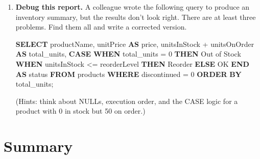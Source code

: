 \documentclass[
  letterpaper,
  DIV=11,
  numbers=noendperiod]{scrreprt}
\newenvironment{Shaded}{\begin{snugshade}}{\end{snugshade}}
\newcommand{\ControlFlowTok}[1]{\textcolor[rgb]{0.00,0.23,0.31}{\textbf{#1}}}
\newcommand{\DecValTok}[1]{\textcolor[rgb]{0.68,0.00,0.00}{#1}}
\newcommand{\KeywordTok}[1]{\textcolor[rgb]{0.00,0.23,0.31}{\textbf{#1}}}
\newcommand{\NormalTok}[1]{\textcolor[rgb]{0.00,0.23,0.31}{#1}}
\newcommand{\OperatorTok}[1]{\textcolor[rgb]{0.37,0.37,0.37}{#1}}
\newcommand{\StringTok}[1]{\textcolor[rgb]{0.13,0.47,0.30}{#1}}
\begin{document}
\begin{enumerate}
\begin{codelisting}
  \end{codelisting}

  Then explain in your own words why
  \texttt{WHERE\ region\ !=\ \textquotesingle{}WA\textquotesingle{}}
  does \emph{not} return customers whose region is \texttt{NULL}.
\item
  \textbf{Debug this report.} A colleague wrote the following query to
  produce an inventory summary, but the results don't look right. There
  are at least three problems. Find them all and write a corrected
  version.

  \begin{codelisting}

  \caption{\texttt{duckdb}}

\begin{Shaded}
\begin{Highlighting}[]
\KeywordTok{SELECT}
\NormalTok{    productName,}
\NormalTok{    unitPrice }\KeywordTok{AS}\NormalTok{ price,}
\NormalTok{    unitsInStock }\OperatorTok{+}\NormalTok{ unitsOnOrder }\KeywordTok{AS}\NormalTok{ total\_units,}
    \ControlFlowTok{CASE}
        \ControlFlowTok{WHEN}\NormalTok{ total\_units }\OperatorTok{=} \DecValTok{0} \ControlFlowTok{THEN} \StringTok{\textquotesingle{}Out of Stock\textquotesingle{}}
        \ControlFlowTok{WHEN}\NormalTok{ unitsInStock }\OperatorTok{\textless{}=}\NormalTok{ reorderLevel }\ControlFlowTok{THEN} \StringTok{\textquotesingle{}Reorder\textquotesingle{}}
        \ControlFlowTok{ELSE} \StringTok{\textquotesingle{}OK\textquotesingle{}}
    \ControlFlowTok{END} \KeywordTok{AS}\NormalTok{ status}
\KeywordTok{FROM}\NormalTok{ products}
\KeywordTok{WHERE}\NormalTok{ discontinued }\OperatorTok{=} \DecValTok{0}
\KeywordTok{ORDER} \KeywordTok{BY}\NormalTok{ total\_units;}
\end{Highlighting}
\end{Shaded}

  \end{codelisting}

  (Hints: think about NULLs, execution order, and the CASE logic for a
  product with 0 in stock but 50 on order.)
\end{enumerate}

\section{Summary}\label{summary-6}
\end{document}
